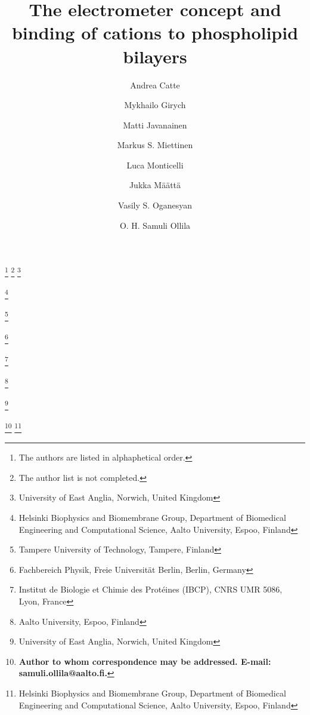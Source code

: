 \documentclass[pre,aps,floatfix,authordate1-4,twocolumn]{revtex4-1}
\begin{document}

\title{The electrometer concept and binding of cations to phospholipid bilayers}

\author{Andrea Catte}
\thanks{The authors are listed in alphaphetical order.}
\thanks{The author list is not completed.}
\thanks{University of East Anglia, Norwich, United Kingdom}
\author{Mykhailo Girych}
\thanks{Helsinki Biophysics and Biomembrane Group, Department of Biomedical Engineering and Computational Science, Aalto University, Espoo, Finland}
\author{Matti Javanainen}
\thanks{Tampere University of Technology, Tampere, Finland}
\author{Markus S. Miettinen}
\thanks{Fachbereich Physik, Freie Universit\"at Berlin, Berlin, Germany}
\author{Luca Monticelli}
\thanks{Institut de Biologie et Chimie des Prot{\'e}ines (IBCP), CNRS UMR 5086, Lyon, France}
\author{Jukka M{\"a}{\"a}tt{\"a}}
\thanks{Aalto University, Espoo, Finland}
\author{Vasily S. Oganesyan}
\thanks{University of East Anglia, Norwich, United Kingdom}
\author{O. H. Samuli Ollila} 
\thanks{{\bf Author to whom correspondence may be addressed. E-mail: samuli.ollila@aalto.fi.}}
\thanks{Helsinki Biophysics and Biomembrane Group, Department of Biomedical Engineering and Computational Science, Aalto University, Espoo, Finland}
\end{document}

